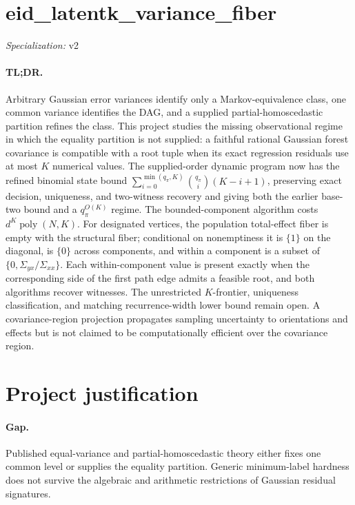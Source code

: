 \documentclass{article}
\begin{document}
\sloppy

\section*{eid\_\allowbreak{}latentk\_\allowbreak{}variance\_\allowbreak{}fiber}

\noindent\textit{Specialization:} v2\par

\paragraph{TL;DR.} Arbitrary Gaussian error variances identify only a Markov-equivalence class, one common variance identifies the DAG, and a supplied partial-homoscedastic partition refines the class. This project studies the missing observational regime in which the equality partition is not supplied: a faithful rational Gaussian forest covariance is compatible with a root tuple when its exact regression residuals use at most \(K\) numerical values. The supplied-order dynamic program now has the refined binomial state bound \(\sum_{i=0}^{\min(q_\pi,K)}\binom{q_\pi}{i}(K-i+1)\), preserving exact decision, uniqueness, and two-witness recovery and giving both the earlier base-two bound and a \(q_\pi^{O(K)}\) regime. The bounded-component algorithm costs \(d^K\operatorname{poly}(N,K)\). For designated vertices, the population total-effect fiber is empty with the structural fiber; conditional on nonemptiness it is \(\{1\}\) on the diagonal, is \(\{0\}\) across components, and within a component is a subset of \(\{0,\Sigma_{yx}/\Sigma_{xx}\}\). Each within-component value is present exactly when the corresponding side of the first path edge admits a feasible root, and both algorithms recover witnesses. The unrestricted \(K\)-frontier, uniqueness classification, and matching recurrence-width lower bound remain open. A covariance-region projection propagates sampling uncertainty to orientations and effects but is not claimed to be computationally efficient over the covariance region.

\section{Project justification}

\paragraph{Gap.} Published equal-variance and partial-homoscedastic theory either fixes one common level or supplies the equality partition. Generic minimum-label hardness does not survive the algebraic and arithmetic restrictions of Gaussian residual signatures.
\end{document}
